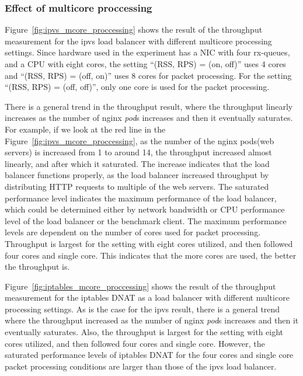 \FloatBarrier

\subsubsection{Effect of multicore proccessing}

Figure~\ref{fig:ipvs_mcore_proccessing} shows the result of the throughput measurement for the ipvs load balancer with different multicore processing settings.
Since hardware used in the experiment has a NIC with four rx-queues, and a CPU with eight cores,
the setting \enquote{(RSS, RPS) = (on, off)} uses 4 cores and \enquote{(RSS, RPS) = (off, on)} uses 8 cores for packet processing.
For the setting \enquote{(RSS, RPS) = (off, off)}, only one core is used for the packet processing.

There is a general trend in the throughput result, where the throughput linearly increases as the number of nginx {\em pod}s increases and then it eventually saturates.
For example, if we look at the red line in the Figure~\ref{fig:ipvs_mcore_proccessing}, as the number of the nginx pods(web servers) is increased from 1 to around 14, the throughput increased almost linearly, and after which it saturated.
The increase indicates that the load balancer functions properly, as the load balancer increased throughput by distributing HTTP requests to multiple of the web servers.
%
The saturated performance level indicates the maximum performance of the load balancer, which could be determined either by network bandwidth or CPU performance level of the load balancer or the benchmark client.
%
The maximum performance levels are dependent on the number of cores used for packet processing.
Throughput is largest for the setting with eight cores utilized, and then followed four cores and single core.
This indicates that the more cores are used, the better the throughput is.

Figure~\ref{fig:iptables_mcore_proccessing} shows the result of the throughput measurement for the iptables DNAT as a load balancer with different multicore processing settings.
As is the case for the ipvs result, there is a general trend where the throughput increased as the number of nginx {\em pod}s increases and then it eventually saturates.
Also, the throughput is largest for the setting with eight cores utilized, and then followed four cores and single core.
However, the saturated performance levels of iptables DNAT for the four cores and single core packet processing conditions are larger than those of the ipvs load balancer.

